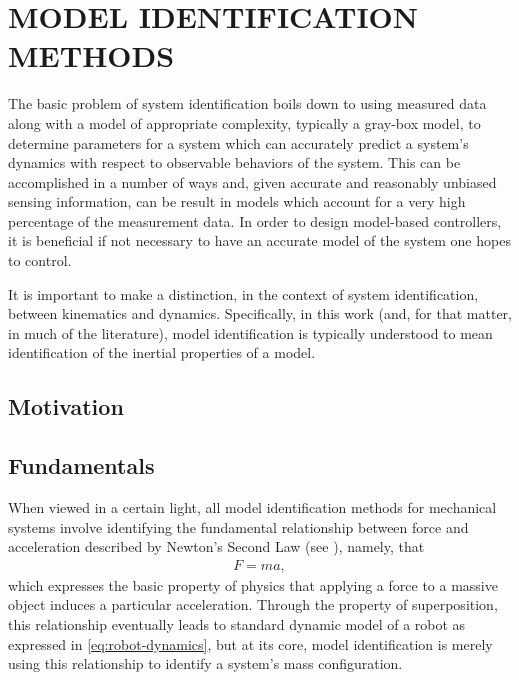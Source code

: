 \chapter{\uppercase{Model Identification Methods}}

The basic problem of system identification boils down to using measured data along with a model of appropriate complexity, typically a gray-box model, to determine parameters for a system which can accurately predict a system's dynamics with respect to observable behaviors of the system.
%
This can be accomplished in a number of ways and, given accurate and reasonably unbiased sensing information, can be result in models which account for a very high percentage of the measurement data.
%
In order to design model-based controllers, it is beneficial if not necessary to have an accurate model of the system one hopes to control.


It is important to make a distinction, in the context of system identification, between kinematics and dynamics.
%
Specifically, in this work (and, for that matter, in much of the literature), model identification is typically understood to mean identification of the inertial properties of a model.
%

\section{Motivation}


\section{Fundamentals}
When viewed in a certain light, all model identification methods for mechanical
systems involve identifying the fundamental relationship between force and
acceleration described by Newton's Second Law (see \cite{feynman1963}), namely,
that
\begin{align}
  \label{eq:newtons-second}
  F = m a,
\end{align}
which expresses the basic property of physics that applying a force to a massive
object induces a particular acceleration.
%
Through the property of superposition, this relationship eventually leads to
standard dynamic model of a robot as expressed in \ref{eq:robot-dynamics}, but
at its core, model identification is merely using this relationship to identify
a system's mass configuration.

